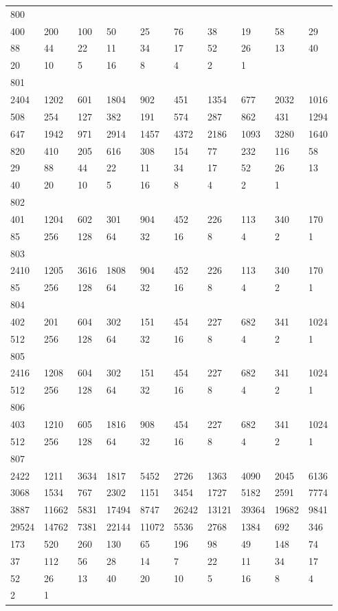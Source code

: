 \begin{longtable}{*{10}{l}}
800&&&&&&&&&\\
400& 200& 100& 50& 25& 76& 38& 19& 58& 29\\
88& 44& 22& 11& 34& 17& 52& 26& 13& 40\\
20& 10& 5& 16& 8& 4& 2& 1& \\

801&&&&&&&&&\\
2404& 1202& 601& 1804& 902& 451& 1354& 677& 2032& 1016\\
508& 254& 127& 382& 191& 574& 287& 862& 431& 1294\\
647& 1942& 971& 2914& 1457& 4372& 2186& 1093& 3280& 1640\\
820& 410& 205& 616& 308& 154& 77& 232& 116& 58\\
29& 88& 44& 22& 11& 34& 17& 52& 26& 13\\
40& 20& 10& 5& 16& 8& 4& 2& 1& \\

802&&&&&&&&&\\
401& 1204& 602& 301& 904& 452& 226& 113& 340& 170\\
85& 256& 128& 64& 32& 16& 8& 4& 2& 1\\

803&&&&&&&&&\\
2410& 1205& 3616& 1808& 904& 452& 226& 113& 340& 170\\
85& 256& 128& 64& 32& 16& 8& 4& 2& 1\\

804&&&&&&&&&\\
402& 201& 604& 302& 151& 454& 227& 682& 341& 1024\\
512& 256& 128& 64& 32& 16& 8& 4& 2& 1\\

805&&&&&&&&&\\
2416& 1208& 604& 302& 151& 454& 227& 682& 341& 1024\\
512& 256& 128& 64& 32& 16& 8& 4& 2& 1\\

806&&&&&&&&&\\
403& 1210& 605& 1816& 908& 454& 227& 682& 341& 1024\\
512& 256& 128& 64& 32& 16& 8& 4& 2& 1\\

807&&&&&&&&&\\
2422& 1211& 3634& 1817& 5452& 2726& 1363& 4090& 2045& 6136\\
3068& 1534& 767& 2302& 1151& 3454& 1727& 5182& 2591& 7774\\
3887& 11662& 5831& 17494& 8747& 26242& 13121& 39364& 19682& 9841\\
29524& 14762& 7381& 22144& 11072& 5536& 2768& 1384& 692& 346\\
173& 520& 260& 130& 65& 196& 98& 49& 148& 74\\
37& 112& 56& 28& 14& 7& 22& 11& 34& 17\\
52& 26& 13& 40& 20& 10& 5& 16& 8& 4\\
2& 1& \\


\end{longtable}
